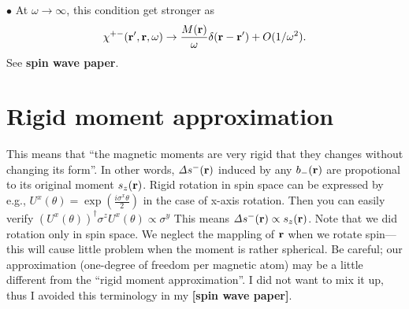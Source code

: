 \documentclass[a4paper,10pt,epsf,fleqn]{article}
\newcommand{\bfr}{{\bf r}}
\newcommand{\ds}{\displaystyle}
\newcommand{\D}{{\it \Delta}}
\newcommand{\scgw}{QS{\it GW} }
\newcommand{\figs}[2]{\hspace{-2cm}\rotatebox{0}{\texttt{[image: \#1]}}\rotatebox{0}{\texttt{[image: \#2]}}}
\begin{document}
{{{\noindent $\bullet$ At $\omega \to \infty$, this condition get stronger as
\begin{eqnarray}
\chi^{+-}(\bfr',\bfr,\omega) \to
\frac{M(\bfr)}{\omega} \delta(\bfr-\bfr') + O(1/\omega^2).
\label{summ2}
\end{eqnarray}
See {\bf spin wave paper}.


\section{Rigid moment approximation} 
This means that ``the magnetic moments are very rigid that they
changes without changing its form''. 
In other words, $\D s^-(\bfr)$ induced by any $b_-(\bfr)$ 
are propotional to its original moment $s_z(\bfr)$.
Rigid rotation in spin space can be expressed by e.g.,
$\ds U^x(\theta)=\exp\left( \frac{i \sigma^x \theta}{2}\right)$ in the case of x-axis rotation.
Then you can easily verify
$(U^x(\theta))^\dagger \sigma^z U^x(\theta) \propto \sigma^y$
This means $\D s^-(\bfr) \propto s_z(\bfr)$. 
Note that we did rotation only in spin space.
We neglect the mappling of $\bfr$ when we rotate spin---this will cause
little problem when the moment is rather spherical.
Be careful; our approximation (one-degree of freedom per magnetic atom) 
may be a little different from the ``rigid moment approximation''.
I did not want to mix it up, thus I avoided this terminology in my {\bf [spin wave paper]}.








}}}
\end{document}
